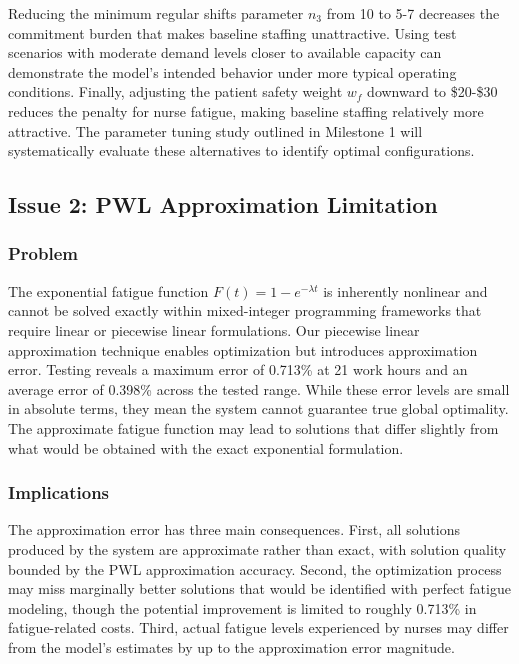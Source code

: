 \documentclass[11pt,letterpaper]{article}
\begin{document}
Reducing the minimum regular shifts parameter $n_3$ from 10 to 5-7 decreases the commitment burden that makes baseline staffing unattractive. Using test scenarios with moderate demand levels closer to available capacity can demonstrate the model's intended behavior under more typical operating conditions. Finally, adjusting the patient safety weight $w_f$ downward to \$20-\$30 reduces the penalty for nurse fatigue, making baseline staffing relatively more attractive. The parameter tuning study outlined in Milestone 1 will systematically evaluate these alternatives to identify optimal configurations.

\subsection{Issue 2: PWL Approximation Limitation}

\subsubsection{Problem}
The exponential fatigue function $F(t) = 1 - e^{-\lambda t}$ is inherently nonlinear and cannot be solved exactly within mixed-integer programming frameworks that require linear or piecewise linear formulations. Our piecewise linear approximation technique enables optimization but introduces approximation error. Testing reveals a maximum error of 0.713\% at 21 work hours and an average error of 0.398\% across the tested range. While these error levels are small in absolute terms, they mean the system cannot guarantee true global optimality. The approximate fatigue function may lead to solutions that differ slightly from what would be obtained with the exact exponential formulation.

\subsubsection{Implications}
The approximation error has three main consequences. First, all solutions produced by the system are approximate rather than exact, with solution quality bounded by the PWL approximation accuracy. Second, the optimization process may miss marginally better solutions that would be identified with perfect fatigue modeling, though the potential improvement is limited to roughly 0.713\% in fatigue-related costs. Third, actual fatigue levels experienced by nurses may differ from the model's estimates by up to the approximation error magnitude.
\end{document}
